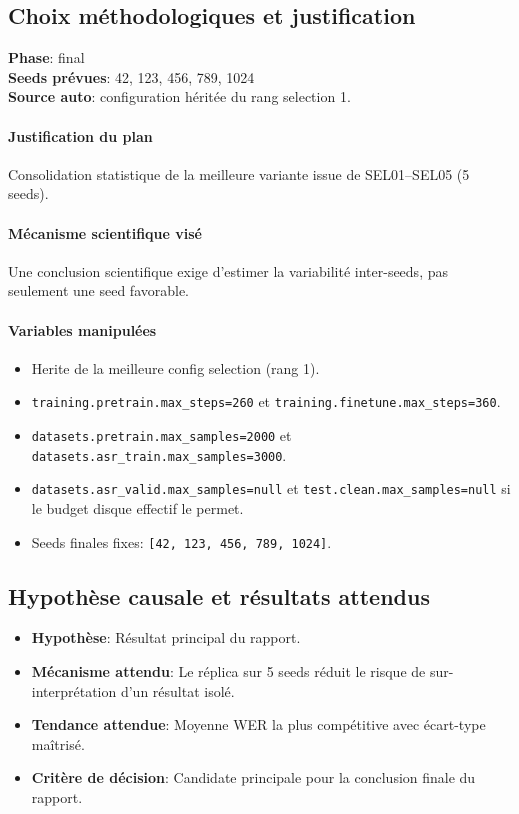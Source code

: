 \documentclass[11pt,a4paper]{article}
\begin{document}
\subsection{Choix méthodologiques et justification}
\textbf{Phase}: final\\
\textbf{Seeds prévues}: 42, 123, 456, 789, 1024\\
\textbf{Source auto}: configuration héritée du rang selection 1.

\paragraph{Justification du plan}
Consolidation statistique de la meilleure variante issue de SEL01--SEL05 (5 seeds).

\paragraph{Mécanisme scientifique visé}
Une conclusion scientifique exige d'estimer la variabilité inter-seeds, pas seulement une seed favorable.

\paragraph{Variables manipulées}
\begin{itemize}
\item Herite de la meilleure config selection (rang 1).
\item \texttt{training.pretrain.max\_steps=260} et \texttt{training.finetune.max\_steps=360}.
\item \texttt{datasets.pretrain.max\_samples=2000} et \texttt{datasets.asr\_train.max\_samples=3000}.
\item \texttt{datasets.asr\_valid.max\_samples=null} et \texttt{test.clean.max\_samples=null} si le budget disque effectif le permet.
\item Seeds finales fixes: \texttt{[42, 123, 456, 789, 1024]}.
\end{itemize}

\subsection{Hypothèse causale et résultats attendus}
\begin{itemize}[leftmargin=1.2cm]
\item \textbf{Hypothèse}: Résultat principal du rapport.
\item \textbf{Mécanisme attendu}: Le réplica sur 5 seeds réduit le risque de sur-interprétation d'un résultat isolé.
\item \textbf{Tendance attendue}: Moyenne WER la plus compétitive avec écart-type maîtrisé.
\item \textbf{Critère de décision}: Candidate principale pour la conclusion finale du rapport.
\end{itemize}
\end{document}
